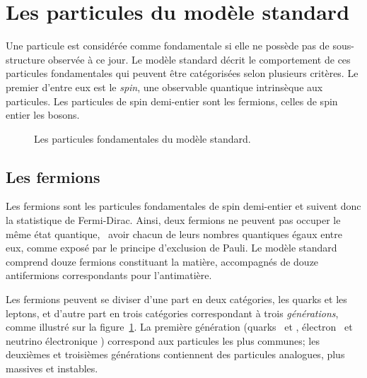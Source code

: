 \section{Les particules du modèle standard}\label{chapter-MS-MSSM-section-SM_ptcs}
Une particule est considérée comme fondamentale si elle ne possède pas de sous-structure observée à ce jour. %
Le modèle standard décrit le comportement de ces particules fondamentales qui peuvent être catégorisées selon plusieurs critères.
Le premier d'entre eux est le \emph{spin}, une observable quantique intrinsèque aux particules.
Les particules de spin demi-entier sont les fermions, celles de spin entier les bosons.
\begin{figure}[h]
\centering
\ifdefined\homedir \else {}\fi
{}
\caption{Les particules fondamentales du modèle standard.}
\label{fig-MS-table}
\end{figure}

\subsection{Les fermions}\label{chapter-MS-MSSM-section-SM_ptcs-subsec-fermions}
Les fermions sont les particules fondamentales de spin demi-entier et suivent donc la statistique de Fermi-Dirac.
Ainsi, deux fermions ne peuvent pas occuper le même état quantique, \ie\ avoir chacun de leurs nombres quantiques égaux entre eux, comme exposé par le principe d'exclusion de Pauli.
Le modèle standard comprend douze fermions constituant la matière, accompagnés de douze antifermions correspondants pour l'antimatière.
\par Les fermions peuvent se diviser d'une part en deux catégories, les quarks et les leptons, et d'autre part en trois catégories correspondant à trois \emph{générations}, comme illustré sur la figure~\ref{fig-MS-table}. La première génération (quarks \quarku\ et \quarkd, électron \electron\ et neutrino électronique \nuele) correspond aux particules les plus communes; les deuxièmes et troisièmes générations contiennent des particules analogues, plus massives et instables.

